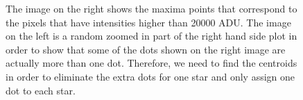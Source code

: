\documentclass[letterpaper,12pt]{article}
\begin{document}
\begin{figure}[h!]
                                                                                                                                                                                                                                                                                                                                                                                                                                                                                                                                                                                                                                                                                                                                                                                                                                                                                                                                                                                \caption{The image on the right shows the maxima points that correspond to the pixels that have intensities higher than 20000 ADU. The image on the left is a random zoomed in part of the right hand side plot in order to show that some of the dots shown on the right image are actually more than one dot. Therefore, we need to find the centroids in order to eliminate the extra dots for one star and only assign one dot to each star.}                                                                                                                                                                                                                                                                                                                                                                                                                                                                                                                                                                                                                                                                                                                                                                                                                                                                                                                                                                                                                                                                                                                                                                                                                                                                                                                                                                                                                                                                                                                                                                                                                                                                                                                                                                                                                                                                                                                                                                                                                    
\end{figure}
\end{document}
